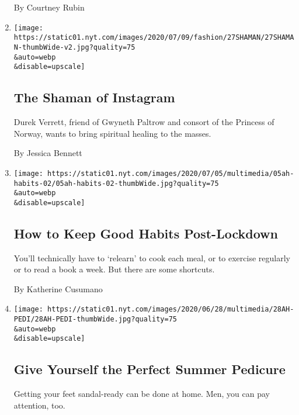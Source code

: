 \begin{enumerate}
  By Courtney Rubin
\item
  \href{/2020/07/03/style/self-care/durek-verrett-instagram-shaman.html}{}

  \texttt{[image: https://static01.nyt.com/images/2020/07/09/fashion/27SHAMAN/27SHAMAN-thumbWide-v2.jpg?quality=75\\\&auto=webp\\\&disable=upscale]}

  \hypertarget{the-shaman-of-instagram}{%
  \subsection{The Shaman of Instagram}\label{the-shaman-of-instagram}}

  Durek Verrett, friend of Gwyneth Paltrow and consort of the Princess
  of Norway, wants to bring spiritual healing to the masses.

  By Jessica Bennett
\item
  \href{/2020/07/02/at-home/coronavirus-keep-good-habits.html}{}

  \texttt{[image: https://static01.nyt.com/images/2020/07/05/multimedia/05ah-habits-02/05ah-habits-02-thumbWide.jpg?quality=75\\\&auto=webp\\\&disable=upscale]}

  \hypertarget{how-to-keep-good-habits-post-lockdown}{%
  \subsection{How to Keep Good Habits
  Post-Lockdown}\label{how-to-keep-good-habits-post-lockdown}}

  You'll technically have to `relearn' to cook each meal, or to exercise
  regularly or to read a book a week. But there are some shortcuts.

  By Katherine Cusumano
\item
  \href{/2020/06/27/at-home/coronavirus-DIY-pedicure.html}{}

  \texttt{[image: https://static01.nyt.com/images/2020/06/28/multimedia/28AH-PEDI/28AH-PEDI-thumbWide.jpg?quality=75\\\&auto=webp\\\&disable=upscale]}

  \hypertarget{give-yourself-the-perfect-summer-pedicure}{%
  \subsection{Give Yourself the Perfect Summer
  Pedicure}\label{give-yourself-the-perfect-summer-pedicure}}

  Getting your feet sandal-ready can be done at home. Men, you can pay
  attention, too.


\end{enumerate}
